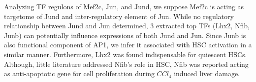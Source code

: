 \documentclass[fleqn,10pt]{wlscirep}
\begin{document}
\begin{itemize}
        Analyzing TF regulons of Mef2c, Jun, and Jund, we suppose Mef2c is acting as targetome of Jund and inter-regulatory element of Jun.
        While no regulatory relationship between Jund and Jun determined, 3 extracted top TFs (Lhx2, Nfib, Junb) can potentially influence expressions of both Jund and Jun.
        Since Junb is also functional component of AP1, we infer it associated with HSC activation in a similar manner.
        Furthermore, Lhx2 was found indispensable for quiescent HSCs. \cite{lhx2_fibro, Lhx2_hsc_1}
        Although, little literature addressed Nfib's role in HSC, Nfib was reported acting as anti-apoptotic gene for cell proliferation during $CCl_4$ induced liver damage. \cite{Nfib_sadly}
    \end{itemize}

\end{document}

